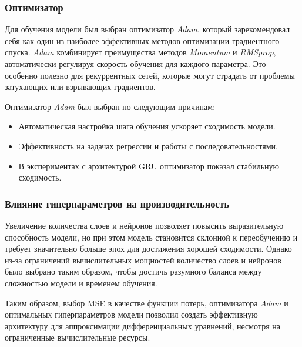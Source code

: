 \subsubsection{Оптимизатор}

Для обучения модели был выбран оптимизатор \textit{Adam}, который зарекомендовал себя как один из наиболее эффективных методов оптимизации градиентного спуска. \textit{Adam} комбинирует преимущества методов \textit{Momentum} и \textit{RMSprop}, автоматически регулируя скорость обучения для каждого параметра. Это особенно полезно для рекуррентных сетей, которые могут страдать от проблемы затухающих или взрывающих градиентов.

Оптимизатор \textit{Adam} был выбран по следующим причинам:
\begin{itemize}
    \item Автоматическая настройка шага обучения ускоряет сходимость модели.
    \item Эффективность на задачах регрессии и работы с последовательностями.
    \item В экспериментах с архитектурой GRU оптимизатор показал стабильную сходимость.
\end{itemize}

\subsubsection{Влияние гиперпараметров на производительность}

Увеличение количества слоев и нейронов позволяет повысить выразительную способность модели, но при этом модель становится склонной к переобучению и требует значительно больше эпох для достижения хорошей сходимости. Однако из-за ограничений вычислительных мощностей количество слоев и нейронов было выбрано таким образом, чтобы достичь разумного баланса между сложностью модели и временем обучения.

Таким образом, выбор MSE в качестве функции потерь, оптимизатора \textit{Adam} и оптимальных гиперпараметров модели позволил создать эффективную архитектуру для аппроксимации дифференциальных уравнений, несмотря на ограниченные вычислительные ресурсы.